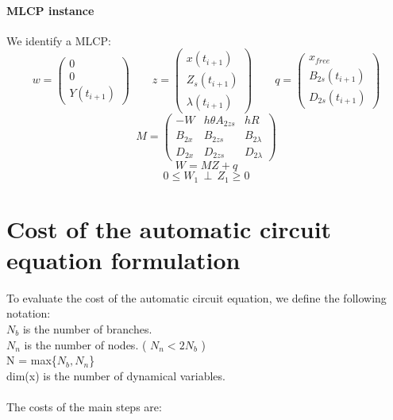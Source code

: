 \paragraph{MLCP instance}
We identify a MLCP:\\

\[w=\left(\begin{array}{c}0\\0\\Y(t_{i+1})\end{array}\right) \qquad
z=\left(\begin{array}{c}x(t_{i+1})\\Z_{s}(t_{i+1})\\ \lambda (t_{i+1})\end{array}\right) \qquad
q=\left(\begin{array}{c}x_{free}\\B_{2s}(t_{i+1})\\ D_{2s} (t_{i+1})\end{array}\right)\]
\[M=\left(\begin{array}{ccc}-W&h \theta A_{2zs}& hR \\B_{2x}&B_{2zs}&B_{2 \lambda} \\D_{2x} &
  D_{2zs} & D_{2 \lambda} \end{array}\right)\]
\[W=MZ+q\]
\[0 \leq W_{1} \, \perp \, Z_{1} \geq 0\]

\newpage

\section {Cost of the automatic circuit equation formulation}
To evaluate the cost of the automatic circuit equation, we define the following notation:\\
$N_{b}$ is the number of branches.\\
$N_{n}$ is the number of nodes. ( $N_{n} < 2N_{b}$ )\\
N = max\{$N_{b},N_{n}$\}\\
dim(x) is the number of dynamical variables.\\
\\
The costs of the main steps are:\\

